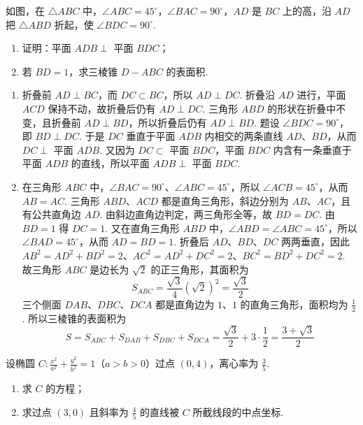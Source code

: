 \begin{problem}
如图，在 \(\triangle ABC\) 中，\(\angle ABC = 45^{\circ}\)，\(\angle BAC = 90^{\circ}\)，\(AD\) 是 \(BC\) 上的高，沿 \(AD\) 把 \(\triangle ABD\) 折起，使 \(\angle BDC = 90^{\circ}\).

\begin{enumerate}
\item 证明：平面 \(ADB \perp\) 平面 \(BDC\)；
\item 若 \(BD = 1\)，求三棱锥 \(D - ABC\) 的表面积.
\end{enumerate}

\end{problem}

\begin{solution}
\begin{enumerate}
\item 折叠前 \(AD\perp BC\)，而 \(DC\subset BC\)，所以 \(AD\perp DC\). 折叠沿 \(AD\) 进行，平面 \(ACD\) 保持不动，故折叠后仍有 \(AD\perp DC\). 三角形 \(ABD\) 的形状在折叠中不变，且折叠前 \(AD\perp BD\)，所以折叠后仍有 \(AD\perp BD\). 题设 \(\angle BDC=90^\circ\)，即 \(BD\perp DC\). 于是 \(DC\) 垂直于平面 \(ADB\) 内相交的两条直线 \(AD\)、\(BD\)，从而 \(DC\perp\) 平面 \(ADB\). 又因为 \(DC\subset\) 平面 \(BDC\)，平面 \(BDC\) 内含有一条垂直于平面 \(ADB\) 的直线，所以平面 \(ADB\perp\) 平面 \(BDC\).
\item 在三角形 \(ABC\) 中，\(\angle BAC=90^\circ\)、\(\angle ABC=45^\circ\)，所以 \(\angle ACB=45^\circ\)，从而 \(AB=AC\). 三角形 \(ABD\)、\(ACD\) 都是直角三角形，斜边分别为 \(AB\)、\(AC\)，且有公共直角边 \(AD\). 由斜边直角边判定，两三角形全等，故 \(BD=DC\). 由 \(BD=1\) 得 \(DC=1\). 又在直角三角形 \(ABD\) 中，\(\angle ABD=\angle ABC=45^\circ\)，所以 \(\angle BAD=45^\circ\)，从而 \(AD=BD=1\). 折叠后 \(AD\)、\(BD\)、\(DC\) 两两垂直，因此
\(AB^2=AD^2+BD^2=2\)、\(AC^2=AD^2+DC^2=2\)、\(BC^2=BD^2+DC^2=2\).
故三角形 \(ABC\) 是边长为 \(\sqrt2\) 的正三角形，其面积为
\[
S_{ABC}=\frac{\sqrt3}{4}(\sqrt2)^2=\frac{\sqrt3}{2}
\]
三个侧面 \(DAB\)、\(DBC\)、\(DCA\) 都是直角边为 \(1\)、\(1\) 的直角三角形，面积均为 \(\frac12\). 所以三棱锥的表面积为
\[
S=S_{ABC}+S_{DAB}+S_{DBC}+S_{DCA}=\frac{\sqrt3}{2}+3\cdot\frac12=\frac{3+\sqrt3}{2}
\]
\end{enumerate}
\end{solution}

\begin{problem}
设椭圆 \(C: \frac{x^2}{a^2} + \frac{y^2}{b^2} = 1\)（\(a > b > 0\)）过点 \((0,4)\)，离心率为 \(\frac{3}{5}\).

\begin{enumerate}
\item 求 \(C\) 的方程；
\item 求过点 \((3,0)\) 且斜率为 \(\frac{4}{5}\) 的直线被 \(C\) 所截线段的中点坐标.
\end{enumerate}
\end{problem}

